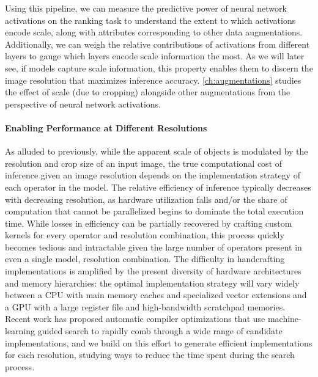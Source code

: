 Using this pipeline, we can measure the predictive power of neural network activations on the ranking task to understand the extent to which activations encode scale, along with attributes corresponding to other data augmentations.
Additionally, we can weigh the relative contributions of activations from different layers to gauge which layers encode scale information the most.
As we will later see, if models capture scale information, this property enables them to discern the image resolution that maximizes inference accuracy.
\autoref{ch:augmentations} studies the effect of scale (due to cropping) alongside other augmentations from the perspective of neural network activations.

\paragraph{Enabling Performance at Different Resolutions}
As alluded to previously, while the apparent scale of objects is modulated by the resolution and crop size of an input image, the true computational cost of inference given an image resolution depends on the implementation strategy of each operator in the model.
The relative efficiency of inference typically decreases with decreasing resolution, as hardware utilization falls and/or the share of computation that cannot be parallelized begins to dominate the total execution time.
While losses in efficiency can be partially recovered by crafting custom kernels for every operator and resolution combination, this process quickly becomes tedious and intractable given the large number of operators present in even a single model, resolution combination.
The difficulty in handcrafting implementations is amplified by the present diversity of hardware architectures and memory hierarchies: the optimal implementation strategy will vary widely between a CPU with main memory caches and specialized vector extensions and a GPU with a large register file and high-bandwidth scratchpad memories.
Recent work has proposed automatic compiler optimizations that use machine-learning guided search to rapidly comb through a wide range of candidate implementations, and we build on this effort to generate efficient implementations for each resolution, studying ways to reduce the time spent during the search process.

